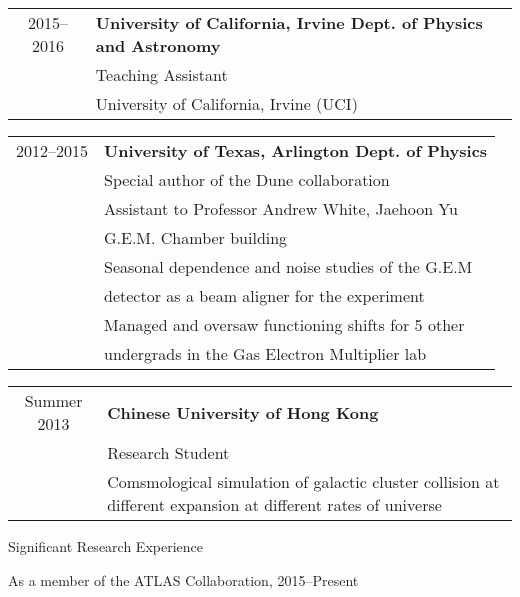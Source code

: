 \vspace{0.1in}
\hspace{0.18in}
\begin{tabular}{c|l}
    2015--2016 & {\bf{University of California, Irvine Dept. of Physics and Astronomy}} \\
              & Teaching Assistant \\
              & University of California, Irvine (UCI) %
\end{tabular}


\vspace{0.1in}
\hspace{0.18in}
\begin{tabular}{c|l}
    2012--2015 & {\bf{University of Texas, Arlington Dept. of Physics}} \\
              & Special author of the Dune collaboration\\
              & Assistant to Professor Andrew White, Jaehoon Yu \\
              & G.E.M. Chamber building \\
              & Seasonal dependence and noise studies of the G.E.M \\
              & detector as a beam aligner for the experiment \\
              & Managed and oversaw functioning shifts for 5 other \\ 
              & undergrads in the Gas Electron Multiplier lab 
\end{tabular}

\vspace{0.1in}
\hspace{0.18in}
\begin{tabular}{c|l}
   Summer 2013 & {\bf{Chinese University of Hong Kong}} \\
             & Research Student \\
             & Comsmological simulation of galactic cluster collision at different expansion at different rates of universe
\end{tabular}




\vspace{0.35in}
{\Large Significant Research Experience}\\
\HRule
\vspace{0.15in}


\hspace{0.25in}
As a member of the ATLAS Collaboration, 2015--Present

